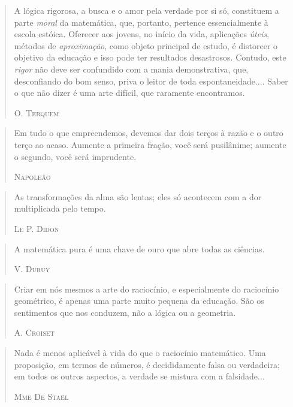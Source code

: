 \documentclass{hipatia}
\begin{document}
 
\begin{quote}
A lógica rigorosa, a busca e o amor pela verdade por si só, constituem a parte \emph{moral} da matemática, que, portanto, pertence essencialmente à escola estóica. Oferecer aos jovens, no início da vida, aplicações \emph{úteis}, métodos de \emph{aproximação}, como objeto principal de estudo, é distorcer o objetivo da educação e isso pode ter resultados desastrosos. Contudo, este \emph{rigor} não deve ser confundido com a mania demonstrativa, que, desconfiando do bom senso, priva o leitor de toda espontaneidade.... Saber o que não dizer é uma arte difícil, que raramente encontramos.

\hfill \textsc{O. Terquem}
\end{quote}

 
\begin{quote}
Em tudo o que empreendemos, devemos dar dois terços à razão e o outro terço ao acaso. Aumente a primeira fração, você será pusilânime; aumente o segundo, você será imprudente.

\hfill \textsc{Napoleão}
\end{quote}
 

 
\begin{quote}
As transformações da alma são lentas; eles só acontecem com a dor multiplicada pelo tempo.

\hfill \textsc{Le P. Didon}
\end{quote}

\begin{quote}
A matemática pura é uma chave de ouro que abre todas as ciências.

\hfill \textsc{V. Duruy}
\end{quote}


\begin{quote}
Criar em nós mesmos a arte do raciocínio, e especialmente do raciocínio geométrico, é apenas uma parte muito pequena da educação. São os sentimentos que nos conduzem, não a lógica ou a geometria.

\hfill \textsc{A. Croiset}
\end{quote}

 
\begin{quote}
Nada é menos aplicável à vida do que o raciocínio matemático. Uma proposição, em termos de números, é decididamente falsa ou verdadeira; em todos os outros aspectos, a verdade se mistura com a falsidade...

\hfill \textsc{Mme De Staël}
\end{quote}
\end{document}

